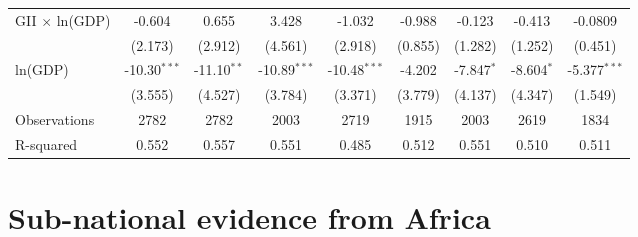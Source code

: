 \documentclass[9pt,letterpaper,subeqn]{beamer}
\begin{document}
\begin{frame}[plain,label=placebo3]
\begin{table}[htbp]
{\begin{tabular}{l*{8}{c}}
GII $\times$ ln(GDP)     &      -0.604         &       0.655         &       3.428         &      -1.032         &      -0.988         &      -0.123         &      -0.413         &     -0.0809         \\
            &     (2.173)         &     (2.912)         &     (4.561)         &     (2.918)         &     (0.855)         &     (1.282)         &     (1.252)         &     (0.451)         \\

ln(GDP)         &      -10.30$^{***}$&      -11.10$^{**}$ &      -10.89$^{***}$&      -10.48$^{***}$&      -4.202         &      -7.847$^{*}$  &      -8.604$^{*}$  &      -5.377$^{***}$\\
            &     (3.555)         &     (4.527)         &     (3.784)         &     (3.371)         &     (3.779)         &     (4.137)         &     (4.347)         &     (1.549)         \\
\hline
Observations      &        2782         &        2782         &        2003         &        2719         &        1915         &        2003         &        2619         &        1834         \\
R-squared          &       0.552         &       0.557         &       0.551         &       0.485         &       0.512         &       0.551         &       0.510         &       0.511         \\
\hline\hline
\end{tabular}}\end{table}

\end{frame}



\section{Sub-national evidence from Africa}

\end{document}
